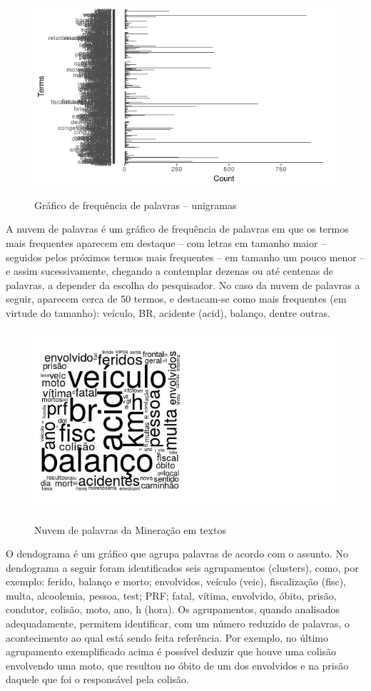 \pagebreak

\begin{figure}
\centering
\caption{Gráfico de frequência de palavras -- unigramas}
\includegraphics[width=0.9\linewidth]{Figuras/Twitter/freqPalavras}
\label{fig:freqPalavras}
\end{figure}

\quad

A nuvem de palavras é um gráfico de frequência de palavras em que os termos mais frequentes aparecem em destaque -- com letras em tamanho maior -- seguidos pelos próximos termos mais frequentes -- em tamanho um pouco menor -- e assim sucessivamente, chegando a contemplar dezenas ou até centenas de palavras, a depender da escolha do pesquisador. No caso da nuvem de palavras a seguir, aparecem cerca de 50 termos, e destacam-se como mais frequentes (em virtude do tamanho): veículo, BR, acidente (acid), balanço, dentre outras. 

\begin{figure}
\centering
\caption{Nuvem de palavras da Mineração em textos}
\includegraphics[width=0.7\linewidth]{Figuras/Twitter//Nuvem1}
\label{fig:Nuvem1}
\end{figure}


\pagebreak

O dendograma é um gráfico que agrupa palavras de acordo com o assunto. No dendograma a seguir foram identificados seis agrupamentos (clusters), como, por exemplo: ferido, balanço e morto; envolvidos, veículo (veic), fiscalização (fisc), multa, alcoolemia, pessoa, test; PRF; fatal, vítima, envolvido, óbito, prisão, condutor, colisão, moto, ano, h (hora). Os agrupamentos, quando analisados adequadamente, permitem identificar, com um número reduzido de palavras, o acontecimento ao qual está sendo feita referência. Por exemplo, no último agrupamento exemplificado acima é possível deduzir que houve uma colisão envolvendo uma moto, que resultou no óbito de um dos envolvidos e na prisão daquele que foi o responsável pela colisão.   

